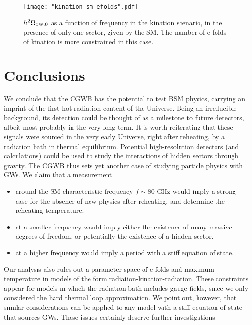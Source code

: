 \documentclass[a4paper,11pt]{article}
\newcommand{\tti}[1]{\text{\tiny{#1}}}
\begin{document}
\begin{figure}[t!]
\centerline{\texttt{[image: "kination\_sm\_efolds".pdf]}}
\caption{$h^2 \Omega_{\tti{GW},0}$ as a function of frequency in the kination scenario, in the presence of only one sector, given by the SM. The number of e-folds of kination is more constrained in this case.}
\label{fig:smkination}
\end{figure}


\section{Conclusions}\label{sec:conclusions}

We conclude that the CGWB has the potential to test BSM physics, carrying an imprint of the first hot radiation content of the Universe. Being an irreducible background, its detection could  be thought of as a milestone to future detectors, albeit most probably in the very  long term.  %
It is worth reiterating that these signals were sourced in the very early Universe, right after reheating, by a radiation bath in thermal equilibrium. Potential high-resolution detectors (and calculations) could be used to study the interactions of hidden sectors through gravity. The CGWB thus sets yet another case \cite{Aggarwal:2020olq} of studying particle physics with GWs. 
We claim that a measurement 
\begin{itemize}
\item around the SM characteristic frequency $f \sim 80$ GHz would imply a strong case for the absence of new physics after reheating, and determine the reheating temperature. 
\item at a smaller frequency would imply either the existence of many massive degrees of freedom, or potentially the existence of a hidden sector. 
\item at a higher frequency would imply a period with a stiff equation of state.
\end{itemize}


Our analysis also rules out a parameter space of e-folds and maximum temperature in models of the form radiation-kination-radiation. These constraints appear for models in which the radiation bath includes gauge fields, since we only considered the hard thermal loop approximation. We point out, however, that similar considerations can be applied to any model with a stiff equation of state that sources GWs. These issues certainly deserve further investigations.
\end{document}
